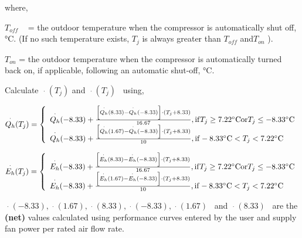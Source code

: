 where,

\({T_{off}}\) ~ = the outdoor temperature when the compressor is automatically shut off, °C. (If no such temperature exists, \({T_j}\) is always greater than \({T_{off}}\) and\({T_{on}}\) ).

\({T_{on}}\) = the outdoor temperature when the compressor is automatically turned back on, if applicable, following an automatic shut-off, °C.

Calculate \(\mathop {{Q_h}}\limits^ \cdot ({T_j})\) and \(\mathop {{E_h}}\limits^ \cdot ({T_j})\) ~using,

\begin{equation}
\mathop {{Q_h}}\limits^ \cdot  ({T_j}) = \left\{ \begin{array}{l}\mathop {{Q_h}}\limits^ \cdot  ( - 8.33) + \frac{{\left[ {\mathop {{Q_h}}\limits^ \cdot  (8.33) - \mathop {{Q_h}}\limits^ \cdot  ( - 8.33)} \right] \cdot \left( {{T_j} + 8.33} \right)}}{{16.67}}{\rm{, if }}{T_j} \ge 7.22^\circ {\rm{C or }}{T_j} \le  - 8.33^\circ {\rm{C}}\\\mathop {{Q_h}}\limits^ \cdot  ( - 8.33) + \frac{{\left[ {\mathop {{Q_h}}\limits^ \cdot  (1.67) - \mathop {{Q_h}}\limits^ \cdot  ( - 8.33)} \right] \cdot \left( {{T_j} + 8.33} \right)}}{{10}}{\rm{, if }} - 8.33^\circ {\rm{C}} < {T_j} < 7.22^\circ {\rm{C}}\end{array} \right.
\end{equation}

\begin{equation}
\mathop {{E_h}}\limits^ \cdot  ({T_j}) = \left\{ \begin{array}{l}\mathop {{E_h}}\limits^ \cdot  ( - 8.33) + \frac{{\left[ {\mathop {{E_h}}\limits^ \cdot  (8.33) - \mathop {{E_h}}\limits^ \cdot  ( - 8.33)} \right] \cdot \left( {{T_j} + 8.33} \right)}}{{16.67}}{\rm{, if }}{T_j} \ge 7.22^\circ {\rm{C or }}{T_j} \le  - 8.33^\circ {\rm{C}}\\\mathop {{E_h}}\limits^ \cdot  ( - 8.33) + \frac{{\left[ {\mathop {{E_h}}\limits^ \cdot  (1.67) - \mathop {{E_h}}\limits^ \cdot  ( - 8.33)} \right] \cdot \left( {{T_j} + 8.33} \right)}}{{10}}{\rm{, if }} - 8.33^\circ {\rm{C}} < {T_j} < 7.22^\circ {\rm{C}}\end{array} \right.
\end{equation}

\(\mathop {{Q_h}}\limits^ \cdot ( - 8.33),\mathop {{Q_h}}\limits^ \cdot (1.67),\mathop {{Q_h}}\limits^ \cdot (8.33),\mathop {{E_h}}\limits^ \cdot ( - 8.33),\mathop {{E_h}}\limits^ \cdot (1.67)\) ~and \(\mathop {{E_h}}\limits^ \cdot (8.33)\) ~are the \textbf{(net)} values calculated using performance curves entered by the user and supply fan power per rated air flow rate.

